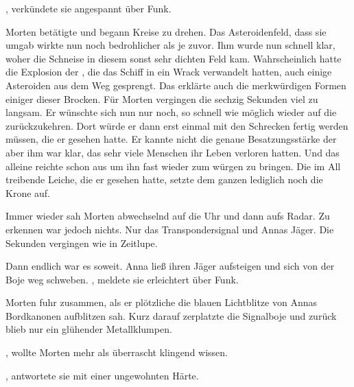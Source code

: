 \par

, verkündete sie angespannt über Funk.

\par

Morten betätigte und begann Kreise zu drehen. Das Asteroidenfeld, dass sie umgab wirkte nun noch bedrohlicher als je zuvor. Ihm wurde nun schnell klar, woher die Schneise in diesem sonst sehr dichten Feld kam. Wahrscheinlich hatte die Explosion der , die das Schiff in ein Wrack verwandelt hatten, auch einige Asteroiden aus dem Weg gesprengt. Das erklärte auch die merkwürdigen Formen einiger dieser Brocken. Für Morten vergingen die sechzig Sekunden viel zu langsam. Er wünschte sich nun nur noch, so schnell wie möglich wieder auf die  zurückzukehren. Dort würde er dann erst einmal mit den Schrecken fertig werden müssen, die er gesehen hatte. Er kannte nicht die genaue Besatzungsstärke der  aber ihm war klar, das sehr viele Menschen ihr Leben verloren hatten. Und das alleine reichte schon aus um ihn fast wieder zum würgen zu bringen. Die im All treibende Leiche, die er gesehen hatte, setzte dem ganzen lediglich noch die Krone auf.

\par

Immer wieder sah Morten abwechselnd auf die Uhr und dann aufs Radar. Zu erkennen war jedoch nichts. Nur das Transpondersignal und Annas Jäger. Die Sekunden vergingen wie in Zeitlupe.

\par

Dann endlich war es soweit. Anna ließ ihren Jäger aufsteigen und sich von der Boje weg schweben. , meldete sie erleichtert über Funk.

\par

Morten fuhr zusammen, als er plötzliche die blauen Lichtblitze von Annas Bordkanonen aufblitzen sah. Kurz darauf zerplatzte die Signalboje und zurück blieb nur ein glühender Metallklumpen.

\par

, wollte Morten mehr als überrascht klingend wissen.

\par

, antwortete sie mit einer ungewohnten Härte. 

